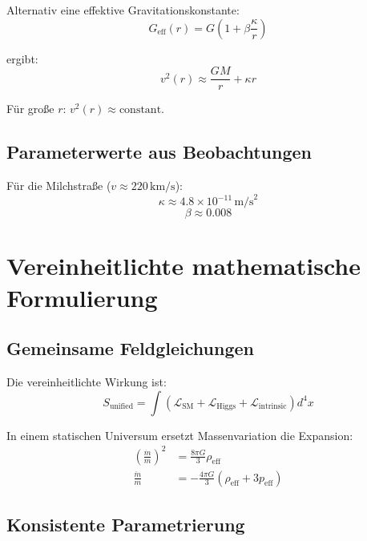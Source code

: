 \documentclass[a4paper,12pt]{article}
\theoremstyle{definition}
\theoremstyle{remark}
\begin{document}
	Alternativ eine effektive Gravitationskonstante:
	\begin{equation}
		G_{\text{eff}}(r) = G \left(1 + \beta \frac{\kappa}{r}\right)
	\end{equation}
	
	ergibt:
	\begin{equation}
		v^2(r) \approx \frac{G M}{r} + \kappa r
	\end{equation}
	
	Für große \(r\): \(v^2(r) \approx \text{constant}\).
	
	\subsection{Parameterwerte aus Beobachtungen}
	
	Für die Milchstraße (\(v \approx 220 \, \text{km/s}\)):
	\begin{equation}
		\kappa \approx 4.8 \times 10^{-11} \, \text{m/s}^2
	\end{equation}
	\begin{equation}
		\beta \approx 0.008
	\end{equation}
	
	\section{Vereinheitlichte mathematische Formulierung}
	
	\subsection{Gemeinsame Feldgleichungen}
	
	Die vereinheitlichte Wirkung ist:
	\begin{equation}
		S_\text{unified} = \int \left( \mathcal{L}_\text{SM} + \mathcal{L}_\text{Higgs} + \mathcal{L}_\text{intrinsic} \right) d^4x
	\end{equation}
	
	In einem statischen Universum ersetzt Massenvariation die Expansion:
	\begin{align}
		\left(\frac{\dot{m}}{m}\right)^2 &= \frac{8\pi G}{3} \rho_{\text{eff}} \\
		\frac{\ddot{m}}{m} &= -\frac{4\pi G}{3} (\rho_{\text{eff}} + 3p_{\text{eff}})
	\end{align}
	
	\subsection{Konsistente Parametrierung}
	
\end{document}
